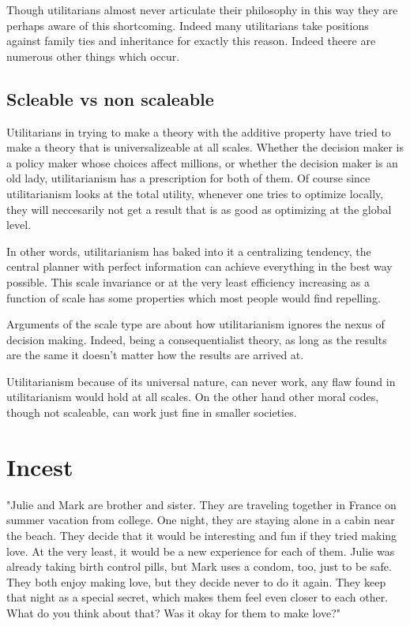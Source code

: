 \documentclass[12pt]{report}
\numberwithin{equation}{section}
\begin{document}
Though utilitarians almost never articulate their philosophy in this way they are perhaps aware of this shortcoming. Indeed many utilitarians take positions against family ties and inheritance for exactly this reason. Indeed theere are numerous other things which occur. 
 


\subsection{Scleable vs non scaleable}

Utilitarians in trying to make a theory with the additive property have tried to make a theory that is universalizeable at all scales. Whether the decision maker is a policy maker whose choices affect millions, or whether the decision maker is an old lady, utilitarianism has a prescription for both of them. Of course since utilitarianism looks at the total utility, whenever one tries to optimize locally, they will neccesarily not get a result that is as good as optimizing at the global level. 

In other words, utilitarianism has baked into it a centralizing tendency, the central planner with perfect information can achieve everything in the best way possible. This scale invariance or at the very least efficiency increasing as a function of scale has some properties which most people would find repelling. 

Arguments of the scale type are about how utilitarianism ignores the nexus of decision making. Indeed, being a consequentialist theory, as long as the results are the same it doesn't matter how the results are arrived at. 

Utilitarianism because of its universal nature, can never work, any flaw found in utilitarianism would hold at all scales. 
On the other hand other moral codes, though not scaleable, can work just fine in smaller societies. 

\section{Incest}

"Julie and Mark are brother and sister. They are traveling together in France on summer vacation from college. One night, they are staying alone in a cabin near the beach. They decide that it would be interesting and fun if they tried making love. At the very least, it would be a new experience for each of them. Julie was already taking birth control pills, but Mark uses a condom, too, just to be safe. They both enjoy making love, but they decide never to do it again. They keep that night as a special secret, which makes them feel even closer to each other. What do you think about that? Was it okay for them to make love?"
\end{document}
